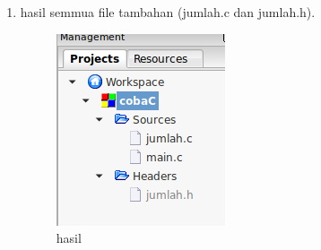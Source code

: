 \documentclass[12pt,]{article}
\begin{document}
\begin{enumerate}
		\item hasil semmua file tambahan (jumlah.c dan jumlah.h).
		\begin{figure}[H]
			\centering
			\includegraphics[width=0.35\linewidth]{images/c_mul_3}
			\caption{hasil}
		\end{figure}
	\end{enumerate}
\end{document}
